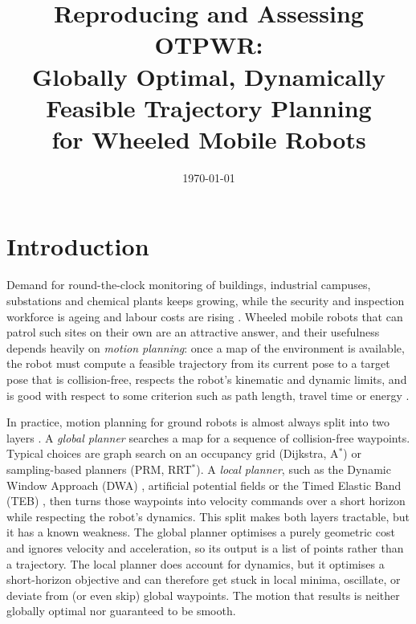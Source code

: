 \documentclass[11pt,a4paper]{article}
\title{Reproducing and Assessing OTPWR:\\
Globally Optimal, Dynamically Feasible Trajectory Planning\\
for Wheeled Mobile Robots}
\author{}
\date{\today}
\begin{document}
\maketitle

\section{Introduction}
\label{sec:intro}

Demand for round-the-clock monitoring of buildings, industrial campuses,
substations and chemical plants keeps growing, while the security and
inspection workforce is ageing and labour costs are rising
\citep{luo2024otpwr,gao2018patrol}. Wheeled mobile robots that can patrol
such sites on their own are an attractive answer, and their usefulness
depends heavily on \emph{motion planning}: once a map of the environment is
available, the robot must compute a feasible trajectory from its current pose
to a target pose that is collision-free, respects the robot's kinematic and
dynamic limits, and is good with respect to some criterion such as path
length, travel time or energy
\citep{lavalle2006planning,siegwart2011introduction}.

In practice, motion planning for ground robots is almost always split into
two layers \citep{marder2010office,paden2016survey}. A \emph{global planner}
searches a map for a sequence of collision-free waypoints. Typical choices
are graph search on an occupancy grid (Dijkstra, A$^\ast$) or sampling-based
planners (PRM, RRT$^\ast$). A \emph{local planner}, such as the Dynamic Window
Approach (DWA) \citep{fox1997dwa}, artificial potential fields
\citep{khatib1986realtime} or the Timed Elastic Band (TEB)
\citep{rosmann2012teb}, then turns those waypoints into velocity commands
over a short horizon while respecting the robot's dynamics. This split makes
both layers tractable, but it has a known weakness. The global planner
optimises a purely geometric cost and ignores velocity and acceleration, so
its output is a list of points rather than a trajectory. The local planner
does account for dynamics, but it optimises a short-horizon objective and can
therefore get stuck in local minima, oscillate, or deviate from (or even skip)
global waypoints. The motion that results is neither globally optimal nor
guaranteed to be smooth.
\end{document}
